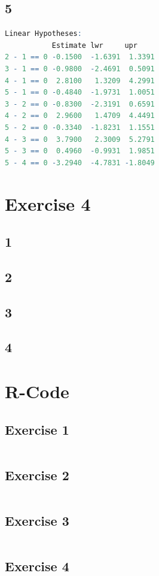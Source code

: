 \documentclass{article}
\begin{document}
    \subsection*{5}
      \begin{lstlisting}[language=R]
Linear Hypotheses:
           Estimate lwr     upr    
2 - 1 == 0 -0.1500  -1.6391  1.3391
3 - 1 == 0 -0.9800  -2.4691  0.5091
4 - 1 == 0  2.8100   1.3209  4.2991
5 - 1 == 0 -0.4840  -1.9731  1.0051
3 - 2 == 0 -0.8300  -2.3191  0.6591
4 - 2 == 0  2.9600   1.4709  4.4491
5 - 2 == 0 -0.3340  -1.8231  1.1551
4 - 3 == 0  3.7900   2.3009  5.2791
5 - 3 == 0  0.4960  -0.9931  1.9851
5 - 4 == 0 -3.2940  -4.7831 -1.8049
      \end{lstlisting}
    
  \section*{Exercise 4}
    \subsection*{1}
    
    \subsection*{2}
    
    \subsection*{3}
    
    \subsection*{4}

    
  \section{R-Code}
    \subsection{Exercise 1}\label{sec:RE1}
      \begin{lstlisting}[language=R]
      \end{lstlisting}
    \subsection{Exercise 2}\label{sec:RE2}
      \begin{lstlisting}[language=R]
      \end{lstlisting}
    \subsection{Exercise 3}\label{sec:RE3}
      \begin{lstlisting}[language=R]
      \end{lstlisting}
    \subsection{Exercise 4}\label{sec:RE4}
      \begin{lstlisting}[language=R]
      \end{lstlisting}
\end{document}
